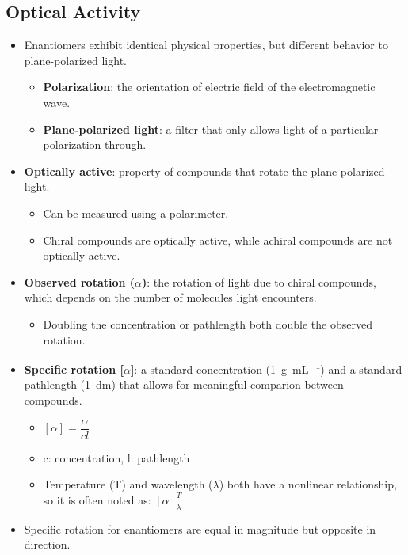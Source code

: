 \documentclass[12pt,a4paper]{article}
\begin{document}
\subsection{Optical Activity}
\begin{itemize}
    \item Enantiomers exhibit identical physical properties, but different behavior to plane-polarized light.
        \begin{itemize}
            \item \textbf{Polarization}: the orientation of electric field of the electromagnetic wave.
            \item \textbf{Plane-polarized light}: a filter that only allows light of a particular polarization through.
        \end{itemize}
    \item \textbf{Optically active}: property of compounds that rotate the plane-polarized light.
        \begin{itemize}
            \item Can be measured using a polarimeter.
            \item {\color{o-Sun}Chiral} compounds are {\color{o-Sun}optically active}, while {\color{o-Sun}achiral} compounds {\color{o-Sun} are not} optically active.
        \end{itemize}
    \item \textbf{Observed rotation ($\alpha$)}: the rotation of light due to chiral compounds, which depends on the number of molecules light encounters.
        \begin{itemize}
            \item Doubling the concentration or pathlength both double the observed rotation.
        \end{itemize}
    \item \textbf{Specific rotation [$\alpha$]}: a standard concentration (\SI{1}{g\per\mL}) and a standard pathlength (\SI{1}{dm}) that allows for meaningful comparion between compounds.
        \begin{itemize}
            \item \([\alpha]=\dfrac{\alpha}{cl}\)
            \item c: concentration, l: pathlength
            \item Temperature (T) and wavelength ($\lambda$) both have a nonlinear relationship, so it is often noted as: \([\alpha]^T_\lambda\)
        \end{itemize}
    \item Specific rotation for enantiomers are {\color{o-Sun}equal in magnitude} but {\color{o-Sun}opposite in direction}.

\end{itemize}
\end{document}
